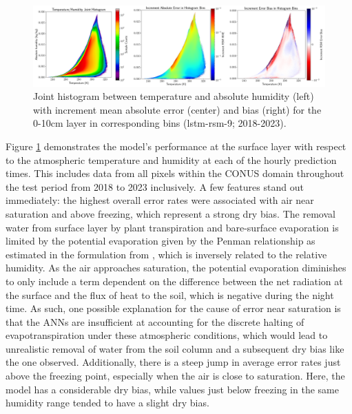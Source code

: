 \begin{figure}[h!]
    \centering

    \includegraphics[width=.99\linewidth,draft=false]{figures/seq-eval_lstm-rsm-9/eval-grid_full_lstm-rsm-9_rsm-10_hist-humidity-temp_all-3.png}

    \caption{Joint histogram between temperature and absolute humidity (left) with increment mean absolute error (center) and bias (right) for the 0-10cm layer in corresponding bins (lstm-rsm-9; 2018-2023).}
    \label{bulk-eval_humidity-temp}
\end{figure}

Figure \ref{bulk-eval_humidity-temp} demonstrates the model's performance at the surface layer with respect to the atmospheric temperature and humidity at each of the hourly prediction times. This includes data from all pixels within the CONUS domain throughout the test period from 2018 to 2023 inclusively. A few features stand out immediately: the highest overall error rates were associated with air near saturation and above freezing, which represent a strong dry bias. The removal water from surface layer by plant transpiration and bare-surface evaporation is limited by the potential evaporation given by the Penman relationship as estimated in the formulation from \citep{mahrt_influence_1984}, which is inversely related to the relative humidity. As the air approaches saturation, the potential evaporation diminishes to only include a term dependent on the difference between the net radiation at the surface and the flux of heat to the soil, which is negative during the night time. As such, one possible explanation for the cause of error near saturation is that the ANNs are insufficient at accounting for the discrete halting of evapotranspiration under these atmospheric conditions, which would lead to unrealistic removal of water from the soil column and a subsequent dry bias like the one observed. Additionally, there is a steep jump in average error rates just above the freezing point, especially when the air is close to saturation. Here, the model has a considerable dry bias, while values just below freezing in the same humidity range tended to have a slight dry bias.

